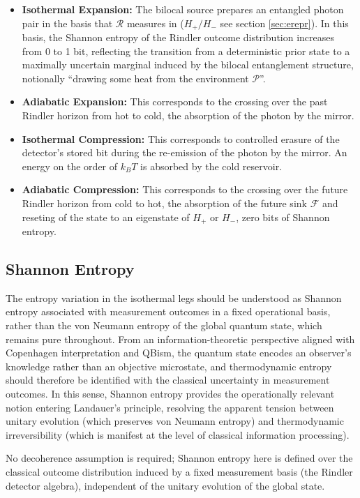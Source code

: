 \documentclass[12pt,a4paper]{article}
\begin{document}
\begin{itemize} 
\item {\bf Isothermal Expansion:} The bilocal source prepares an entangled photon pair in the basis that $\mathcal{R}$ measures in ($H_+/H_-$ see section \ref{sec:erepr}). In this basis, the Shannon entropy of the Rindler outcome distribution increases from 0 to 1 bit, reflecting the transition from a deterministic prior state to a maximally uncertain marginal induced by the bilocal entanglement structure, notionally ``drawing some heat from the environment $\mathcal{P}$''.
\item {\bf Adiabatic Expansion:} This corresponds to the crossing over the past Rindler horizon from hot to cold, the absorption of the photon by the mirror.
\item {\bf Isothermal Compression:} This corresponds to controlled erasure of the detector’s stored bit during the re-emission of the photon by the mirror. An energy on the order of $k_B T$ is absorbed by the cold reservoir. 
\item {\bf Adiabatic Compression:} This corresponds to the crossing over the future Rindler horizon from cold to hot, the absorption of the future sink $\mathcal{F}$ and reseting of the state to an eigenstate of $H_+$ or $H_-$, zero bits of Shannon entropy. 
\end{itemize}


\subsection{Shannon Entropy}

The entropy variation in the isothermal legs should be understood as Shannon entropy associated with measurement outcomes in a fixed operational basis, rather than the von Neumann entropy of the global quantum state, which remains pure throughout. From an information-theoretic perspective aligned with Copenhagen interpretation and QBism, the quantum state encodes an observer’s knowledge rather than an objective microstate, and thermodynamic entropy should therefore be identified with the classical uncertainty in measurement outcomes. In this sense, Shannon entropy provides the operationally relevant notion entering Landauer's principle, resolving the apparent tension between unitary evolution (which preserves von Neumann entropy) and thermodynamic irreversibility (which is manifest at the level of classical information processing).

No decoherence assumption is required; Shannon entropy here is defined over the classical outcome distribution induced by a fixed measurement basis (the Rindler detector algebra), independent of the unitary evolution of the global state.
\end{document}
